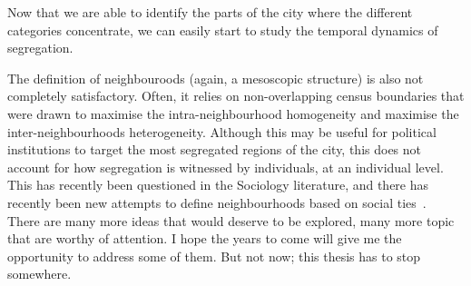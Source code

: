 Now that we are able to identify the parts of the city where the different
categories concentrate, we can easily start to study the temporal dynamics of
segregation. 

The definition of neighbouroods (again, a mesoscopic structure) is also not
completely satisfactory. Often, it relies on non-overlapping census boundaries
that were drawn to maximise the intra-neighbourhood homogeneity and maximise the
inter-neighbourhoods heterogeneity. Although this may be useful for political
institutions to target the most segregated regions of the city, this does not
account for how segregation is witnessed by individuals, at an individual level.
This has recently been questioned in the Sociology literature, and there has
recently been new attempts to define neighbourhoods based on social ties~\cite{Hipp:2012}.\\


There are many more ideas that would deserve to be explored, many more topic
that are worthy of attention. I hope the years to come will give me the opportunity
to address some of them. But not now; this thesis has to stop somewhere.  
